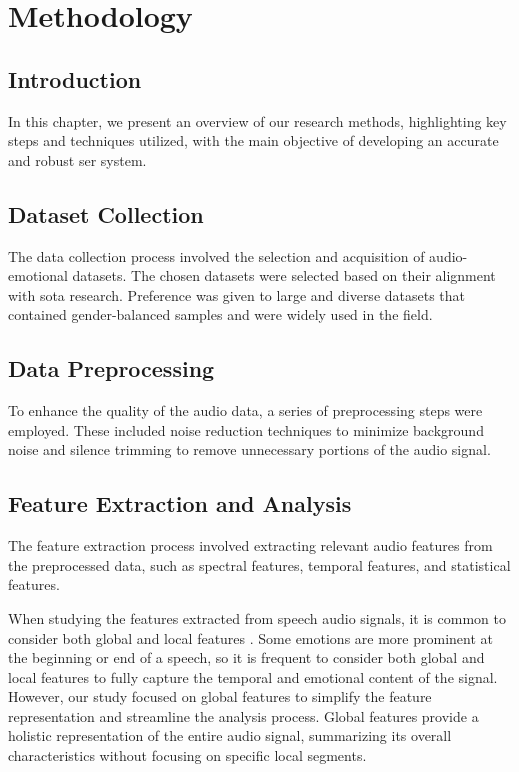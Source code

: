 \chapter{Methodology}
\label{chapter:prop}

\section{Introduction}

In this chapter, we present an overview of our research methods, highlighting key steps and techniques utilized, with the main objective of developing an accurate and robust \ac{ser} system.

\section{Dataset Collection}

The data collection process involved the selection and acquisition of audio-emotional datasets. The chosen datasets were selected based on their alignment with \ac{sota} research. Preference was given to large and diverse datasets that contained gender-balanced samples and were widely used in the field.

\section{Data Preprocessing}

To enhance the quality of the audio data, a series of preprocessing steps were employed. These included noise reduction techniques to minimize background noise and silence trimming to remove unnecessary portions of the audio signal.

\section{Feature Extraction and Analysis}

The feature extraction process involved extracting relevant audio features from the preprocessed data, such as spectral features, temporal features, and statistical features.

When studying the features extracted from speech audio signals, it is common to consider both global and local features \cite{PORIA201798}. Some emotions are more prominent at the beginning or end of a speech, so it is frequent to consider both global and local features to fully capture the temporal and emotional content of the signal. However, our study focused on global features to simplify the feature representation and streamline the analysis process. Global features provide a holistic representation of the entire audio signal, summarizing its overall characteristics without focusing on specific local segments.

